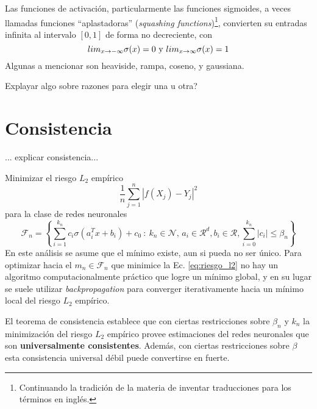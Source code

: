 \documentclass[12pt]{extarticle}
\newenvironment{comentarios_meta}
    {\begin{framed}\noindent\textcolor{red}{\textbf{//}}}
    {\end{framed}}
\begin{document}
    Las funciones de activación, particularmente las funciones sigmoides, a veces llamadas funciones ``aplastadoras'' (\textit{squashing functions})\footnote{Continuando la tradición de la materia de inventar traducciones para los términos en inglés.}, convierten su entradas infinita al intervalo $[0,1]$ de forma no decreciente, con
    \begin{equation*}
        lim_{x \to -\infty} \sigma(x) = 0 \textnormal{ y } lim_{x \to \infty} \sigma(x) = 1
    \end{equation*}
    Algunas a mencionar son heaviside, rampa, coseno, y gaussiana.
    \begin{comentarios_meta}
	Explayar algo sobre razones para elegir una u otra?
    \end{comentarios_meta}

\section{Consistencia}

    \begin{comentarios_meta}
        ... explicar consistencia...
    \end{comentarios_meta}
    
    Minimizar el riesgo $L_2$ empírico
    \begin{equation}
        \label{eq:riesgo_l2}
        \frac{1}{n} \sum_{j=1}^{n} | f(X_j) - Y_j |^2
    \end{equation}
    para la clase de redes neuronales
    \begin{equation*}
	    \mathcal{F}_n = \left\{  \sum_{i=1}^{k_n} c_i \sigma\left(a_i^T x + b_i\right) + c_0 \::\: k_n \in \mathcal{N},\, a_i \in \mathcal{R}^d, b_i \in \mathcal{R}, \sum_{i=0}^{k_n} \left|c_i\right| \leq \beta_n  \right\}
    \end{equation*}
    En este análisis se asume que el mínimo existe, aun si pueda no ser único. Para optimizar hacia el $m_n \in \mathcal{F}_n$ que minimice la Ec. \ref{eq:riesgo_l2} no hay un algoritmo computacionalmente práctico que logre un mínimo global, y en su lugar se suele utilizar \textit{backpropagation} para converger iterativamente hacia un mínimo local del riesgo $L_2$ empírico.

    El teorema de consistencia establece que con ciertas restricciones sobre $\beta_n$ y $k_n$ la minimización del riesgo $L_2$ empírico provee estimaciones del redes neuronales que son \textbf{universalmente consistentes}.
    Además, con ciertas restricciones sobre $\beta$ esta consistencia universal débil puede convertirse en fuerte.
    
\end{document}
